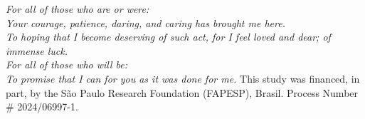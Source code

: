 \begin{center}
\textit{
For all of those who are or were: \\
Your courage, patience, daring, and caring has brought me here. \\
To hoping that I become deserving of such act, for I feel loved and dear; of immense luck. \\
For all of those who will be: \\
To promise that I can for you as it was done for me.
}
\vfill
This study was financed, in part, by the São Paulo Research Foundation (FAPESP), Brasil. Process Number \# 2024/06997-1.
\end{center}


